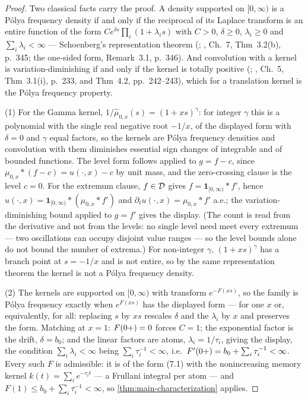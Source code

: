 \begin{proof}
Two classical facts carry the proof. A density supported on $[0,\infty)$ is a P\'olya
frequency density if and only if the reciprocal of its Laplace transform is an entire
function of the form $C e^{\delta s}\prod_i (1 + \lambda_i s)$ with $C > 0$, $\delta \ge 0$,
$\lambda_i \ge 0$ and $\sum_i \lambda_i < \infty$ --- Schoenberg's representation theorem
(; , Ch.~7, Thm~3.2(b), p.~345; the one-sided form,
Remark~3.1, p.~346). And convolution with a kernel is variation-diminishing if and only if
the kernel is totally positive (; , Ch.~5, Thm~3.1(i),
p.~233, and Thm~4.2, pp.~242--243), which for a translation kernel is the P\'olya frequency
property.

(1) For the Gamma kernel, $1/\widehat{\mu}_{0,x}(s) = (1 + xs)^{\gamma}$: for integer
$\gamma$ this is a polynomial with the single real negative root $-1/x$, of the displayed
form with $\delta = 0$ and $\gamma$ equal factors, so the kernels are P\'olya frequency
densities and convolution with them diminishes essential sign changes of integrable and of
bounded functions. The level form follows applied to $g = f - c$, since
$\mu_{0,x} * (f - c) = u(\cdot,x) - c$ by unit mass, and the zero-crossing clause is the
level $c = 0$. For the extremum clause, $f \in \mathcal{D}$ gives
$f = \mathbf{1}_{[0,\infty)} * f'$, hence
$u(\cdot,x) = \mathbf{1}_{[0,\infty)} * (\mu_{0,x} * f')$ and
$\partial_t u(\cdot,x) = \mu_{0,x} * f'$ a.e.; the variation-diminishing bound applied to
$g = f'$ gives the display. (The count is read from the derivative and not from the
levels: no single level need meet every extremum --- two oscillations can occupy disjoint
value ranges --- so the level bounds alone do not bound the number of extrema.) For
non-integer $\gamma$, $(1 + xs)^{\gamma}$ has
a branch point at $s = -1/x$ and is not entire, so by the same representation theorem the
kernel is not a P\'olya frequency density.

(2) The kernels are supported on $[0,\infty)$ with transform $e^{-F(xs)}$, so the family is
P\'olya frequency exactly when $e^{F(xs)}$ has the displayed form --- for one $x$ or,
equivalently, for all: replacing $s$ by $xs$ rescales $\delta$ and the $\lambda_i$ by $x$
and preserves the form. Matching at $x = 1$: $F(0{+}) = 0$ forces $C = 1$; the exponential
factor is the drift, $\delta = b_0$; and the linear factors are atoms, $\lambda_i = 1/\tau_i$,
giving the display, the condition $\sum_i \lambda_i < \infty$ being
$\sum_i \tau_i^{-1} < \infty$, i.e.\ $F'(0{+}) = b_0 + \sum_i \tau_i^{-1} < \infty$.
Every such $F$ is admissible: it is of the form (7.1) with the nonincreasing memory kernel
$k(t) = \sum_i e^{-\tau_i t}$ --- a Frullani integral per atom --- and
$F(1) \le b_0 + \sum_i \tau_i^{-1} < \infty$, so \ref{thm:main-characterization}
applies.
\end{proof}

